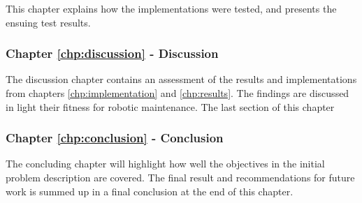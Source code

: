 This chapter explains how the implementations were tested, and presents the ensuing test results. 

\subsubsection{Chapter \ref{chp:discussion} - Discussion}

The discussion chapter contains an assessment of the results and implementations from chapters \ref{chp:implementation} and \ref{chp:results}. The findings are discussed in light their fitness for robotic maintenance. The last section of this chapter  

\subsubsection{Chapter \ref{chp:conclusion} - Conclusion}

The concluding chapter will highlight how well the objectives in the initial problem description are covered. The final result and recommendations for future work is summed up in a final conclusion at the end of this chapter.